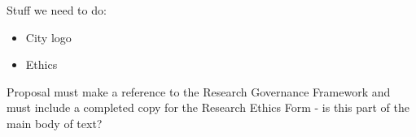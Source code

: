 Stuff we need to do:
\begin{itemize}
    \item City logo
    \item Ethics
\end{itemize}

Proposal must make a reference to the Research Governance Framework and must include a completed copy for the Research Ethics Form - is this part of the main body of text?